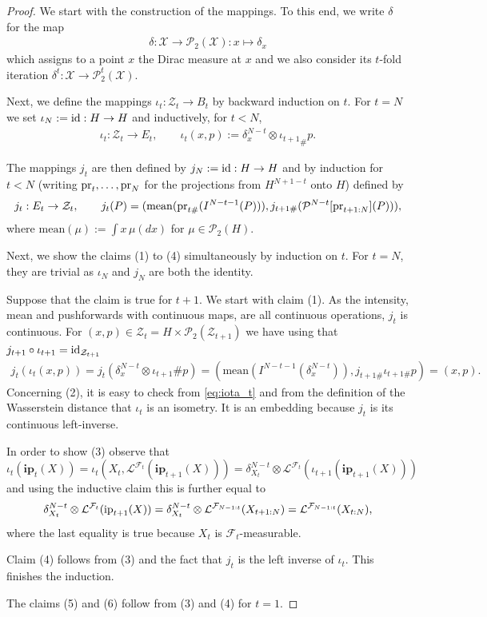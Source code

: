 \documentclass[a4paper]{amsart}
\numberwithin{theorem}{section}
\theoremstyle{definition}
\newcommand{\F}{\mathcal{F}}
\newcommand{\pr}{\textup{pr}}
\newcommand{\id}{\textup{id}}
\newcommand{\law}{\mathcal{L}}
\newcommand{\Pc}{\mathcal P}
\newcommand{\mean}[1]{\mathrm{mean}(#1)}
\renewcommand{\H}{H}
\newcommand{\ip}{\textup{ip}}
\newcommand{\Zc}{\mathcal{Z}}
\newcommand{\ipp}{\mathbf{ip}}
\begin{document}
\begin{proof}
We start with the construction of the mappings. To this end, we write $\delta$ for the map 
\begin{align*}
    \delta : \mathcal{X} \to \Pc_2(\mathcal{X}) : x \mapsto \delta_x
\end{align*}
which assigns to a point $x$ the Dirac measure at $x$ and we also consider its $t$-fold iteration $\delta^t : \mathcal{X} \to \Pc_2^t(\mathcal{X})$.

 Next, we define the mappings  $ \iota_t :  \Zc_t \to B_t$ by backward induction on $t$. For $t=N$ we set 
$
\iota_N := \id : \H \to \H
$
and inductively, for $t <N$,
\begin{align}\label{eq:iota_t}
    \iota_t : \Zc_t \to E_t, \qquad \iota_t(x,p) := \delta^{N-t}_x \otimes {\iota_{t+1}}_\# p.
\end{align}

The mappings $j_t$ are then defined by $j_N := \id : H \to H$ and by induction for $t <N$ (writing $\pr_t, \dots, \pr_N$ for the projections from $H^{N+1-t}$ onto $H$) defined by
\begin{align}\label{eq:j_t}
  j_t : E_t  \to \Zc_t , \qquad  j_t(P) = ( \mean{\pr_{t\#}(I^{N-t-1}(P))}, j_{t+1\#}(\Pc^{N
  -t}[\pr_{t+1:N}](P))),
\end{align}
where $\mean{\mu} := \int x \,\mu(dx)$ for $\mu \in \Pc_2(H)$. 



Next, we show the claims (1) to (4) simultaneously by induction on $t$. For $t=N$, they are trivial as $\iota_N$ and $j_N$ are both the identity. 

Suppose that the claim is true for $t+1$. We start with claim (1). As the intensity,  mean
and pushforwards with continuous maps, are all continuous operations, $j_t$ is continuous. For $(x,p) \in \Zc_t = H \times \Pc_2(\Zc_{t+1})$ we have using that $j_{t+1} \circ \iota_{t+1} = \id_{\Zc_{t+1}}$
\begin{align*}
    j_t(\iota_t(x,p)) = j_t(\delta_x^{N-t} \otimes \iota_{t+1}\#p) = (\mean{I^{N-t-1}( \delta_x^{N-t} )  } , j_{t+1\#}\iota_{t+1\#}p) = (x,p).
\end{align*}
Concerning (2), it is easy to check from \eqref{eq:iota_t} and from the definition of the Wasserstein distance that $\iota_t$ is an isometry. It is an embedding because $j_t$ is its continuous left-inverse.

In order to show (3) observe that
\[
\iota_t(\ipp_t(X)) = \iota_t(X_t, \law^{\F_t}(\ipp_{t+1}(X))) = \delta^{N-t}_{X_t} \otimes \law^{\F_t}( \iota_{t+1}( \ipp_{t+1}(X)  ) )  
\]
and using the inductive claim this is further equal to 
\[
\delta^{N-t}_{X_t} \otimes \law^{\F_t} ( \ip_{t+1}(X) ) = \delta^{N-t}_{X_t} \otimes \law^{\F_{N-1:t}}(X_{t+1:N}) = \law^{\F_{N-1:t}}(X_{t:N}),
\]
where the last equality is true because $X_t$ is $\F_t$-measurable. 

Claim (4) follows from (3) and the fact that $j_t$ is the left inverse of $\iota_t$. This finishes the induction.

The claims (5) and (6) follow from (3) and (4) for $t=1$.
\end{proof}
\end{document}
